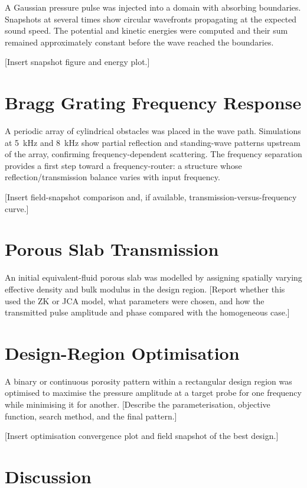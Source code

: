 A Gaussian pressure pulse was injected into a domain with absorbing boundaries. Snapshots at several times show circular wavefronts propagating at the expected sound speed. The potential and kinetic energies were computed and their sum remained approximately constant before the wave reached the boundaries.

[Insert snapshot figure and energy plot.]

\section{Bragg Grating Frequency Response}
\label{sec:bragg_grating}

A periodic array of cylindrical obstacles was placed in the wave path. Simulations at 5~kHz and 8~kHz show partial reflection and standing-wave patterns upstream of the array, confirming frequency-dependent scattering. The frequency separation provides a first step toward a frequency-router: a structure whose reflection/transmission balance varies with input frequency.

[Insert field-snapshot comparison and, if available, transmission-versus-frequency curve.]

\section{Porous Slab Transmission}
\label{sec:porous_slab}

An initial equivalent-fluid porous slab was modelled by assigning spatially varying effective density and bulk modulus in the design region. [Report whether this used the ZK or JCA model, what parameters were chosen, and how the transmitted pulse amplitude and phase compared with the homogeneous case.]

\section{Design-Region Optimisation}
\label{sec:design_optimisation}

A binary or continuous porosity pattern within a rectangular design region was optimised to maximise the pressure amplitude at a target probe for one frequency while minimising it for another. [Describe the parameterisation, objective function, search method, and the final pattern.]

[Insert optimisation convergence plot and field snapshot of the best design.]

\section{Discussion}
\label{sec:discussion}

